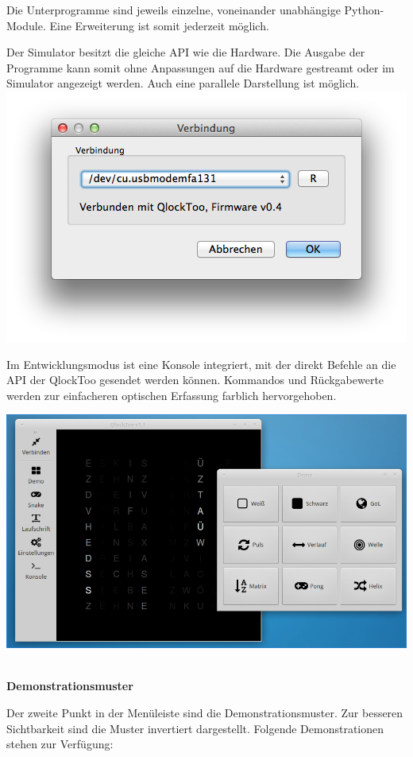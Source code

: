 \begin{multicols}{2}
Die Unterprogramme sind jeweils einzelne, voneinander unabhängige Python-Module. Eine Erweiterung ist somit jederzeit möglich.

Der Simulator besitzt die gleiche API wie die Hardware. Die Ausgabe der Programme kann somit ohne Anpassungen auf die Hardware gestreamt oder im Simulator angezeigt werden. Auch eine parallele Darstellung ist möglich.
\includegraphics[width=\columnwidth]{Abbildungen/Software/ConnectDialog}

Im Entwicklungsmodus ist eine Konsole integriert, mit der direkt Befehle an die API der QlockToo gesendet werden können. Kommandos und Rückgabewerte werden zur einfacheren optischen Erfassung farblich hervorgehoben.

{
\centering
\includegraphics[width=0.9\columnwidth]{Abbildungen/Software/Linux}

}
\ \\
\textbf{Demonstrationsmuster}

Der zweite Punkt in der Menüleiste sind die Demonstrationsmuster. Zur besseren Sichtbarkeit sind die Muster invertiert dargestellt. Folgende Demonstrationen stehen zur Verfügung:


\end{multicols}
